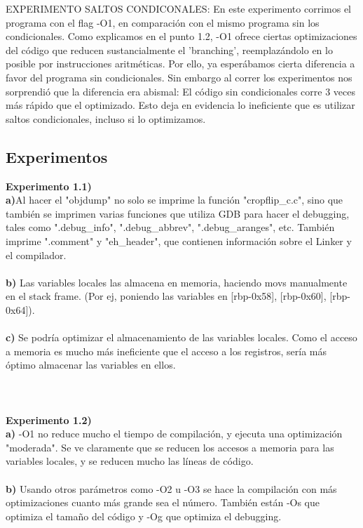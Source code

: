 \documentclass[a4paper]{article}
\begin{document}
EXPERIMENTO SALTOS CONDICONALES:
En este experimento corrimos el programa con el flag -O1, en comparaci\'{o}n con el mismo programa sin los condicionales. Como explicamos en el punto 1.2, -O1 ofrece ciertas optimizaciones del c\'{o}digo que reducen sustancialmente el 'branching', reemplaz\'{a}ndolo en lo posible por instrucciones aritm\'{e}ticas. Por ello, ya esper\'{a}bamos cierta diferencia a favor del programa sin condicionales. Sin embargo al correr los experimentos nos sorprendi\'{o} que la diferencia era abismal: El c\'{o}digo sin condicionales corre 3 veces m\'{a}s r\'{a}pido que el optimizado. Esto deja en evidencia lo ineficiente que es utilizar saltos condicionales, incluso si lo optimizamos.


\newpage

\subsection{Experimentos}

\textbf{Experimento 1.1)}\\

\noindent \textbf{a)}Al hacer el "objdump" no solo se imprime la funci\'{o}n "cropflip\_c.c", sino que tambi\'{e}n se imprimen varias funciones que utiliza GDB para hacer el debugging, tales como ".debug\_info", ".debug\_abbrev", ".debug\_aranges", etc. Tambi\'{e}n imprime ".comment" y "eh\_header", que contienen informaci\'{o}n sobre el Linker y el compilador.\\ \\
 \textbf{b)} Las variables locales las almacena en memoria, haciendo movs manualmente en el stack frame. (Por ej, poniendo las variables en [rbp-0x58], [rbp-0x60], [rbp-0x64]).\\ \\
 \textbf{c)} Se podr\'{i}a optimizar el almacenamiento de las variables locales. Como el acceso a memoria es mucho m\'{a}s ineficiente que el acceso a los registros, ser\'{i}a más \'{o}ptimo almacenar las variables en ellos. \\ \\ \\ \\

\noindent \textbf{Experimento 1.2)}\\

\noindent \textbf{a)} -O1 no reduce mucho el tiempo de compilaci\'{o}n, y ejecuta una optimizaci\'{o}n "moderada". Se ve claramente que se reducen los accesos a memoria para las variables locales, y se reducen mucho las l\'{i}neas de c\'{o}digo.\\ \\
 \textbf{b)} Usando otros par\'{a}metros como -O2 u -O3 se hace la compilaci\'{o}n con más optimizaciones cuanto más grande sea el n\'{u}mero. Tambi\'{e}n est\'{a}n -Os que optimiza el tama\~{n}o del c\'{o}digo y -Og que optimiza el debugging.\\ \\
\end{document}
